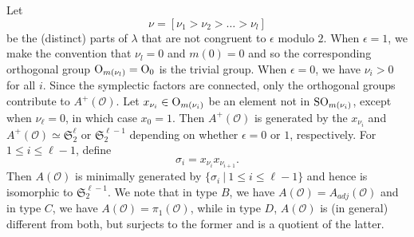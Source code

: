 \documentclass{amsart}
\theoremstyle{definition}
\newcommand{\frakS}{\mathfrak{S}}
\newcommand{\0}{\mathcal{O}}
\begin{document}
Let 
$$\nu = [\nu_1 >  \nu_2 > \dots > \nu_l]$$ be 
the (distinct) parts of $\lambda$ that are not congruent to $\epsilon$ modulo $2$.
When $\epsilon = 1$, we make the convention that $\nu_l=0$ and $m(0)=0$ and so
the corresponding orthogonal group ${\rm O}_{m(\nu_l)} = {\rm O}_{0}$ is the trivial group.
When $\epsilon = 0$, we have $\nu_i>0$ for all $i$.
Since the symplectic factors are connected, only the orthogonal groups 
contribute to $A^+(\0)$.  
Let $x_{\nu_i} \in {\rm O}_{m(\nu_i)}$ be an element not in ${\rm SO}_{m(\nu_i)}$, except when
$\nu_\ell =0$, in which case $x_0 = 1$.
Then $A^+(\0)$ is generated by the $x_{\nu_i}$ and $A^+(\0) \simeq \frakS_2^{\ell}$
or $\mathfrak{S}_2^{\ell-1}$ depending on whether $\epsilon=0$ or $1$, respectively.
For $1 \leq i \leq \ell-1$, define
\[
\sigma_i=x_{\nu_i}x_{\nu_{i+1}}. 
\]
Then $A(\0)$ is minimally generated by $\{\sigma_i \ | \ 1\leq i\leq \ell-1 \}$
and hence is isomorphic to $\mathfrak S_2^{\ell-1}$.
We note that in type $B$, we have $A(\0) = A_{adj}(\0)$ and in type $C$, we have $A(\0) = \pi_1(\0)$,
while in type $D$, $A(\0)$ is (in general) different from both, but surjects to the former and is a quotient of the latter.
\end{document}

